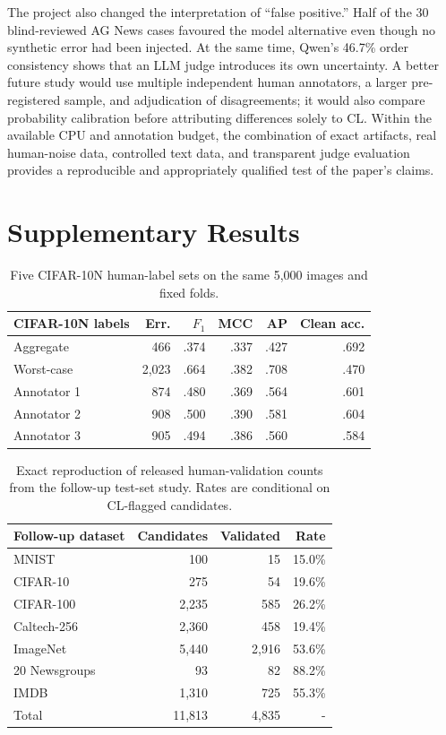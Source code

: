 \documentclass[11pt]{article}
\begin{document}
The project also changed the interpretation of ``false positive.'' Half of the
30 blind-reviewed AG News cases favoured the model alternative even though no
synthetic error had been injected. At the same time, Qwen's 46.7\% order
consistency shows that an LLM judge introduces its own uncertainty. A better
future study would use multiple independent human annotators, a larger
pre-registered sample, and adjudication of disagreements; it would also compare
probability calibration before attributing differences solely to CL. Within
the available CPU and annotation budget, the combination of exact artifacts,
real human-noise data, controlled text data, and transparent judge evaluation
provides a reproducible and appropriately qualified test of the paper's claims.



\appendix

\section{Supplementary Results}

\begin{table}[h]
\centering
\small
\setlength{\tabcolsep}{2.5pt}
\begin{tabular}{lrrrrr}
\toprule
\textbf{CIFAR-10N labels} & \textbf{Err.} & \textbf{$F_1$} & \textbf{MCC} & \textbf{AP} & \textbf{Clean acc.} \\
\midrule
Aggregate & 466 & .374 & .337 & .427 & .692 \\
Worst-case & 2,023 & .664 & .382 & .708 & .470 \\
Annotator 1 & 874 & .480 & .369 & .564 & .601 \\
Annotator 2 & 908 & .500 & .390 & .581 & .604 \\
Annotator 3 & 905 & .494 & .386 & .560 & .584 \\
\bottomrule
\end{tabular}
\caption{Five CIFAR-10N human-label sets on the same 5,000 images and fixed
folds.}
\end{table}

\begin{table}[h]
\centering
\small
\setlength{\tabcolsep}{4pt}
\begin{tabular}{lrrr}
\toprule
\textbf{Follow-up dataset} & \textbf{Candidates} & \textbf{Validated} & \textbf{Rate} \\
\midrule
MNIST & 100 & 15 & 15.0\% \\
CIFAR-10 & 275 & 54 & 19.6\% \\
CIFAR-100 & 2,235 & 585 & 26.2\% \\
Caltech-256 & 2,360 & 458 & 19.4\% \\
ImageNet & 5,440 & 2,916 & 53.6\% \\
20 Newsgroups & 93 & 82 & 88.2\% \\
IMDB & 1,310 & 725 & 55.3\% \\
\midrule
Total & 11,813 & 4,835 & - \\
\bottomrule
\end{tabular}
\caption{Exact reproduction of released human-validation counts from the
follow-up test-set study. Rates are conditional on CL-flagged candidates.}
\end{table}
\end{document}
